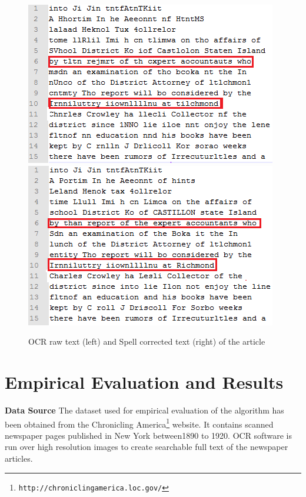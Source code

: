 \documentclass[preprint,11pt]{elsarticle}
\begin{document}
\begin{figure}[!htb]
\includegraphics[scale=0.75]{ocr3}
\includegraphics[scale=0.75]{corrected3}
\caption{OCR raw text (left) and Spell corrected text (right) of the article}
\label{figure:4}
\end{figure} 

\section{Empirical Evaluation and Results}
\label{spell:results}

\noindent \textbf{Data Source} 
The dataset used for empirical evaluation of the algorithm has been obtained from the Chronicling America\footnote{\texttt{http://chroniclingamerica.loc.gov/}} website. It contains scanned newspaper pages published in New York between1890 to 1920. OCR software is run over high
resolution images to create searchable full text of the newspaper articles.
\end{document}
